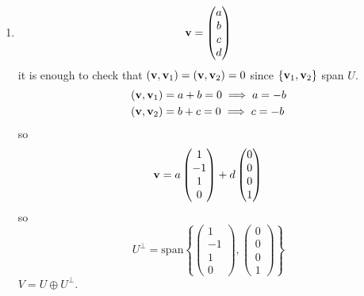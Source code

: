 \documentclass[10pt, a4paper]{article}
\begin{document}
\begin{example}
    \begin{solution}
        \begin{enumerate}[label = (\alph*)]
            \item 
            \[
            \mathbf{v} = \begin{pmatrix}
                a \\ b \\ c \\ d
            \end{pmatrix}
            \]
            it is enough to check that $(\mathbf{v}, \mathbf{v}_1) = (\mathbf{v}, \mathbf{v}_2) = 0$ since $\{\mathbf{v}_1, \mathbf{v}_2\}$ span $U$.
            \begin{align*}
                (\mathbf{v}, \mathbf{v}_1) &= a + b = 0 \implies a = -b \\
                (\mathbf{v}, \mathbf{v}_2) &= b + c = 0 \implies c = -b
            \end{align*}
            so
            \[
            \mathbf{v} = a\begin{pmatrix}
                1 \\ -1 \\ 1 \\ 0 
            \end{pmatrix} + d\begin{pmatrix}
                0 \\ 0 \\ 0 \\ 1
            \end{pmatrix}
            \]
            so
            \[
            U ^ {\perp} = \mathrm{span}\left\{\begin{pmatrix}
                1 \\ -1 \\ 1 \\ 0
            \end{pmatrix}, \begin{pmatrix}
                0 \\ 0 \\ 0 \\ 1
            \end{pmatrix}\right\}
            \]
            $V = U \oplus U ^ {\perp}$.


\end{enumerate}
\end{solution}
\end{example}
\end{document}
